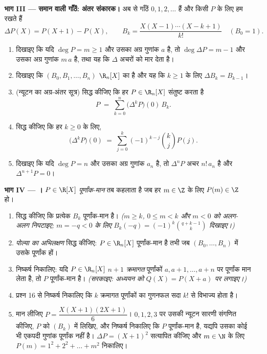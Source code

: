 \begin{problem}
\medskip \noindent\textbf{भाग III --- समान  वाली गाँठें: अंतर संकारक।}
अब से गाँठें $0, 1, 2, \dots$ हैं और किसी  $P$ के लिए हम रखते हैं
\[
\Delta P(X) = P(X + 1) - P(X),
\qquad
B_k = \frac{X(X-1)\cdots(X-k+1)}{k!} \quad (B_0 = 1).
\]
\begin{enumerate}[resume]
  \item दिखाइए कि यदि $\deg P = m \geq 1$ और उसका अग्र गुणांक $a$ है, तो
  $\deg \Delta P = m - 1$ और उसका अग्र गुणांक $m\,a$ है, तथा यह कि $\Delta$
  अचरों को मार देता है।
  \item दिखाइए कि $(B_0, B_1, \dots, B_n)$ $\R_n[X]$ का  है और यह कि $k
  \geq 1$ के लिए $\Delta B_k = B_{k-1}$।
  \item (न्यूटन का अग्र-अंतर सूत्र) सिद्ध कीजिए कि हर $P \in \R_n[X]$
  संतुष्ट करता है
        \[
        P \;=\; \sum_{k=0}^{n} \bigl(\Delta^{k} P\bigr)(0)\, B_k .
        \]
  \item सिद्ध कीजिए कि हर $k \geq 0$ के लिए,
        \[
        \bigl(\Delta^{k} P\bigr)(0) \;=\;
        \sum_{j=0}^{k} (-1)^{k-j} \binom{k}{j} P(j) .
        \]
  \item दिखाइए कि यदि $\deg P = n$ और उसका अग्र गुणांक $a_n$ है, तो
  $\Delta^{n} P$ अचर $n!\,a_n$ है और $\Delta^{n+1} P = 0$।
\end{enumerate}

\medskip \noindent\textbf{भाग IV --- ।}  $P \in
\R[X]$ \emph{पूर्णांक-मान} तब कहलाता है जब हर $m \in \Z$ के लिए $P(m) \in
\Z$ हो।
\begin{enumerate}[resume]
  \item सिद्ध कीजिए कि प्रत्येक $B_k$ पूर्णांक-मान है। \emph{($m \geq k$, $0
  \leq m < k$ और $m < 0$ को अलग-अलग निपटाइए; $m = -q < 0$ के लिए $B_k(-q) =
  (-1)^k \binom{q + k - 1}{k}$ दिखाइए।)}
  \item \emph{पोल्या का अभिलक्षण} सिद्ध कीजिए: $P \in \R_n[X]$ पूर्णांक-मान
  है तभी जब  $(B_0, \dots, B_n)$ में उसके  पूर्णांक हों।
  \item निष्कर्ष निकालिए: यदि $P \in \R_n[X]$ $n + 1$ \emph{क्रमागत}
  पूर्णांकों $a, a+1, \dots, a+n$ पर पूर्णांक मान लेता है, तो $P$
  पूर्णांक-मान है। \emph{(सरकाइए: अध्ययन को $Q(X) = P(X + a)$ पर लगाइए।)}
  \item प्रश्न 16 से निष्कर्ष निकालिए कि $k$ क्रमागत पूर्णांकों का गुणनफल
  सदा $k!$ से विभाज्य होता है।
  \item मान लीजिए $P = \dfrac{X(X+1)(2X+1)}{6}$। $0, 1, 2, 3$ पर उसकी न्यूटन
  सारणी संगणित कीजिए, $P$ को  $(B_k)$ में लिखिए, और निष्कर्ष निकालिए कि
  $P$ पूर्णांक-मान है, यद्यपि उसका कोई भी एकपदी गुणांक पूर्णांक नहीं है।
  $\Delta P = (X+1)^2$ सत्यापित कीजिए और $m \in \N$ के लिए $P(m) = 1^2 + 2^2
  + \dots + m^2$ निकालिए।
\end{enumerate}


\end{problem}

